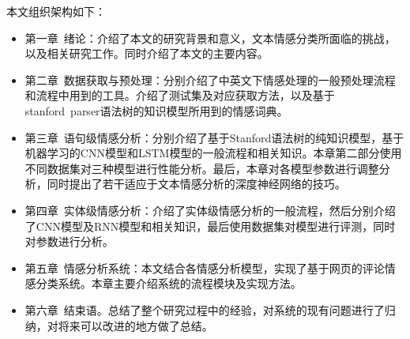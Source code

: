 本文组织架构如下：
\begin{itemize}
\item 第一章\ 绪论：介绍了本文的研究背景和意义，文本情感分类所面临的挑战，以及相关研究工作。同时介绍了本文的主要内容。
\item 第二章\ 数据获取与预处理：分别介绍了中英文下情感处理的一般预处理流程和流程中用到的工具。介绍了测试集及对应获取方法，以及基于stanford\ parser语法树的知识模型所用到的情感词典。
\item 第三章\ 语句级情感分析：分别介绍了基于Stanford语法树的纯知识模型，基于机器学习的CNN模型和LSTM模型的一般流程和相关知识。本章第二部分使用不同数据集对三种模型进行性能分析。最后，本章对各模型参数进行调整分析，同时提出了若干适应于文本情感分析的深度神经网络的技巧。
\item 第四章\ 实体级情感分析：介绍了实体级情感分析的一般流程，然后分别介绍了CNN模型及RNN模型和相关知识，最后使用数据集对模型进行评测，同时对参数进行分析。
\item 第五章\ 情感分析系统：本文结合各情感分析模型，实现了基于网页的评论情感分类系统。本章主要介绍系统的流程模块及实现方法。
\item 第六章\ 结束语。总结了整个研究过程中的经验，对系统的现有问题进行了归纳，对将来可以改进的地方做了总结。
\end{itemize}